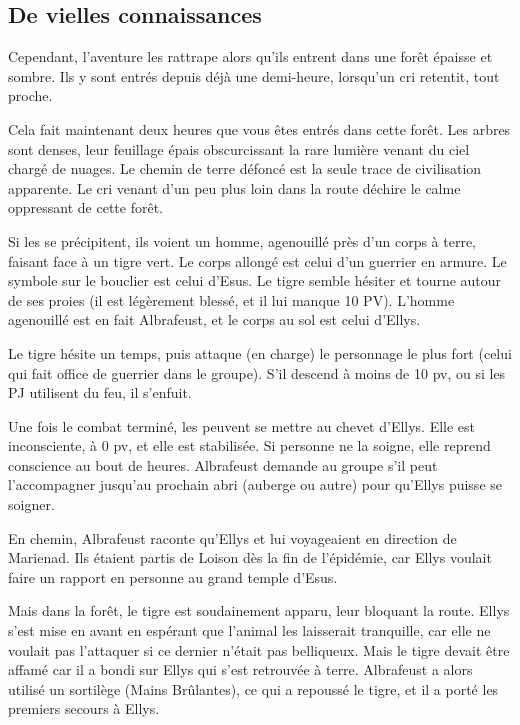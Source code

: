 \documentclass[a4paper,10pt,openany]{book}
\begin{document}
\begin{multicols}{2}
\subsection{De vielles connaissances}
Cependant, l’aventure les rattrape alors qu’ils entrent dans une forêt épaisse et sombre. Ils y sont entrés depuis déjà une demi-heure, lorsqu’un cri
retentit, tout proche.
\begin{paperbox}{ }
	Cela fait maintenant deux heures que vous êtes entrés dans cette forêt. Les arbres sont denses, leur feuillage épais obscurcissant la rare lumière
	venant du ciel chargé de nuages. Le chemin de terre défoncé est la seule trace de civilisation apparente. Le cri venant d’un peu plus loin dans la
	route déchire le calme oppressant de cette forêt.
\end{paperbox}
Si les \PJs se précipitent, ils voient un homme, agenouillé près d’un corps à terre, faisant face à un tigre vert. Le corps allongé est celui d’un
guerrier en armure. Le symbole sur le bouclier est celui d’Esus. Le tigre semble hésiter et tourne autour de ses proies (il est légèrement blessé, et
il lui manque 10 PV). L’homme agenouillé est en fait Albrafeust, et le corps au sol est celui d’Ellys.\par Le tigre hésite un temps, puis attaque
(en charge) le personnage le plus fort (celui qui fait office de guerrier dans le groupe). S’il descend à moins de 10 pv, ou si les PJ utilisent du
feu, il s’enfuit.\par Une fois le combat terminé, les \PJs peuvent se mettre au chevet d’Ellys. Elle est inconsciente, à 0 pv, et elle est stabilisée.
Si personne ne la soigne, elle reprend conscience au bout de  heures. Albrafeust demande au groupe s’il peut l’accompagner jusqu’au prochain
abri (auberge ou autre) pour qu’Ellys puisse se soigner.\par En chemin, Albrafeust raconte qu’Ellys et lui voyageaient en direction de Marienad. Ils
étaient partis de Loison dès la fin de l’épidémie, car Ellys voulait faire un rapport en personne au grand temple d’Esus.\par Mais dans la forêt, le
tigre est soudainement apparu, leur bloquant la route. Ellys s’est mise en avant en espérant que l’animal les laisserait tranquille, car elle ne
voulait pas l’attaquer si ce dernier n’était pas belliqueux. Mais le tigre devait être affamé car il a bondi sur Ellys qui s’est retrouvée à terre.
Albrafeust a alors utilisé un sortilège (Mains Brûlantes), ce qui a repoussé le tigre, et il a porté les premiers secours à Ellys.


\end{multicols}
\end{document}
